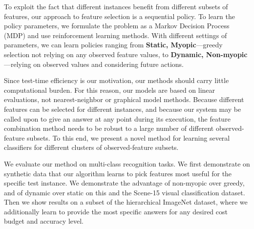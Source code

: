 To exploit the fact that different instances benefit from different subsets of features, our approach to feature selection is a sequential policy.
To learn the policy parameters, we formulate the problem as a Markov Decision Process (MDP) and use reinforcement learning methods.
With different settings of parameters, we can learn policies ranging from \textbf{Static, Myopic}---greedy selection not relying on any observed feature values, to \textbf{Dynamic, Non-myopic}---relying on observed values and considering future actions.

Since test-time efficiency is our motivation, our methods should carry little computational burden.
For this reason, our models are based on linear evaluations, not nearest-neighbor or graphical model methods.
Because different features can be selected for different instances, and because our system may be called upon to give an answer at any point during its execution, the feature combination method needs to be robust to a large number of different observed-feature subsets.
To this end, we present a novel method for learning several classifiers for different clusters of observed-feature subsets.

We evaluate our method on multi-class recognition tasks.
We first demonstrate on synthetic data that our algorithm learns to pick features most useful for the specific test instance.
We demonstrate the advantage of non-myopic over greedy, and of dynamic over static on this and the Scene-15 visual classification dataset.
Then we show results on a subset of the hierarchical ImageNet dataset, where we additionally learn to provide the most specific answers for any desired cost budget and accuracy level.
